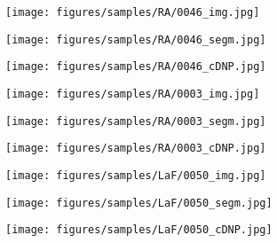 \documentclass[10pt,twocolumn,letterpaper]{article}
\begin{document}
\begin{figure}[h!]
    \centering
    \begin{subfigure}[b]{0.15\textwidth}
        \centering
        \texttt{[image: figures/samples/RA/0046\_img.jpg]}
    \end{subfigure}
    \begin{subfigure}[b]{0.15\textwidth}
        \centering
        \texttt{[image: figures/samples/RA/0046\_segm.jpg]}
    \end{subfigure}
    \begin{subfigure}[b]{0.15\textwidth}
        \centering
        \texttt{[image: figures/samples/RA/0046\_cDNP.jpg]}
    \end{subfigure}
    
    \begin{subfigure}[b]{0.15\textwidth}
        \centering
        \texttt{[image: figures/samples/RA/0003\_img.jpg]}
    \end{subfigure}
    \begin{subfigure}[b]{0.15\textwidth}
        \centering
        \texttt{[image: figures/samples/RA/0003\_segm.jpg]}
    \end{subfigure}
    \begin{subfigure}[b]{0.15\textwidth}
        \centering
        \texttt{[image: figures/samples/RA/0003\_cDNP.jpg]}
    \end{subfigure}
    
    \begin{subfigure}[b]{0.15\textwidth}
        \centering
        \texttt{[image: figures/samples/LaF/0050\_img.jpg]}
    \end{subfigure}
    \begin{subfigure}[b]{0.15\textwidth}
        \centering
        \texttt{[image: figures/samples/LaF/0050\_segm.jpg]}
    \end{subfigure}
    \begin{subfigure}[b]{0.15\textwidth}
        \centering
        \texttt{[image: figures/samples/LaF/0050\_cDNP.jpg]}
    \end{subfigure}
    

\end{figure}
\end{document}
